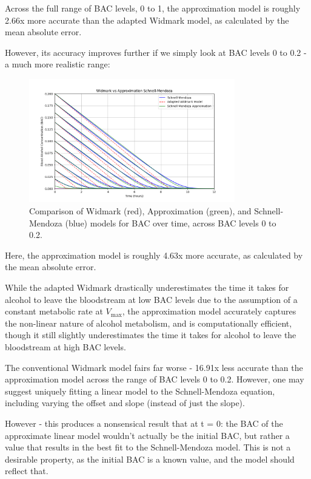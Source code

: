 \documentclass[12pt]{article}
\begin{document}
Across the full range of BAC levels, 0 to 1, the approximation model is roughly 2.66x more accurate than the adapted Widmark model, as calculated by the mean absolute error.

However, its accuracy improves further if we simply look at BAC levels 0 to 0.2 - a much more realistic range:

\begin{figure}[H]
\centering
\includegraphics[width=0.8\textwidth]{widmark_vs_approximation_tiny.png}
\caption{Comparison of Widmark (red), Approximation (green), and Schnell-Mendoza (blue) models for BAC over time, across BAC levels 0 to 0.2.}
\label{fig:comparison}
\end{figure}

Here, the approximation model is roughly 4.63x more accurate, as calculated by the mean absolute error.

While the adapted Widmark drastically underestimates the time it takes for alcohol to leave the bloodstream at low BAC levels due to the assumption of a constant metabolic rate at $V_{\text{max}}$, the approximation model accurately captures the non-linear nature of alcohol metabolism, and is computationally efficient, though it still slightly underestimates the time it takes for alcohol to leave the bloodstream at high BAC levels.

The conventional Widmark model fairs far worse - 16.91x less accurate than the approximation model across the range of BAC levels 0 to 0.2. However, one may suggest uniquely fitting a linear model to the Schnell-Mendoza equation, including varying the offset and slope (instead of just the slope).

However - this produces a nonsensical result that at t = 0: the BAC of the approximate linear model wouldn't actually be the initial BAC, but rather a value that results in the best fit to the Schnell-Mendoza model. This is not a desirable property, as the initial BAC is a known value, and the model should reflect that. 
\end{document}
